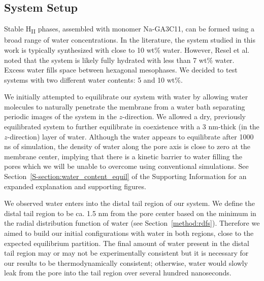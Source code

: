 \documentclass[journal=jpcbfk,manuscript=article]{achemso}
\begin{document}
  \subsection{System Setup}\label{method:system_setup}

  Stable H\textsubscript{II} phases, assembled with monomer Na-GA3C11, can be formed
  using a broad range of water concentrations. In the literature, the system 
  studied in this work is typically synthesized with close to 10 wt\% water.
  \cite{smith_ordered_1997, zhou_new_2007} However, Resel et al. noted that the
  system is likely fully hydrated with less than 7 wt\% water.~\cite{resel_h2-phase_2000}
  Excess water fills space between hexagonal mesophases. We decided to test 
  systems with two different water contents: 5 and 10 wt\%.
  
  We initially attempted to equilibrate our system with water by allowing water
  molecules to naturally penetrate the membrane from a water bath separating
  periodic images of the system in the $z$-direction. We allowed a dry, previously
  equilibrated system to further equilibrate in coexistence with a 3 nm-thick 
  (in the $z$-direction) layer of water. Although the water appears to equilibrate
  after 1000 ns of simulation, the density of water along the pore axis
  is close to zero at the membrane center, implying that there is a kinetic
  barrier to water filling the pores which we will be unable to overcome using
  conventional simulations. See Section~\ref{S-section:water_content_equil} 
  of the Supporting Information for an expanded explanation and supporting figures. 
	  
  We observed water enters into the distal tail region of our system. We define the 
  distal tail region to be ca. 1.5 nm from the pore center based on the minimum in 
  the radial distribution function of water (see Section~\ref{method:rdfs}). Therefore
  we aimed to build our initial configurations with water in both regions, close to
  the expected equilibrium partition. The final amount of water present in the distal
  tail region may or may not be experimentally consistent but it is necessary for our
  results to be thermodynamically consistent; otherwise, water would slowly leak 
  from the pore into the tail region over several hundred nanoseconds. 
	
\end{document}
